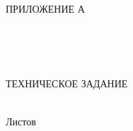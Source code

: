 \begin{ESKDtitlePage}
  \begin{flushright}
    ПРИЛОЖЕНИЕ А \enspace
  \end{flushright}
  
  \begin{center}
    \envDiplomEducation \\
    \envDiplomUniversity \\
    \envDiplomCathedra \\
  \end{center}

  \vfill

  \begin{center}
    ТЕХНИЧЕСКОЕ ЗАДАНИЕ
  \end{center}

  \vfill

  \begin{center}
    \envCode \\
    Листов \pageref{LastPage} \\
  \end{center}

  \vfill

  

  \vfill

  \begin{center}
    \ESKDtheYear
  \end{center}
\end{ESKDtitlePage}

